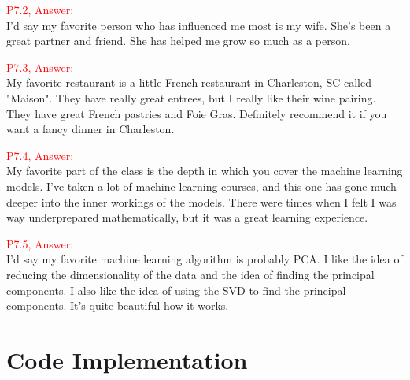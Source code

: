 \documentclass[11pt]{article}
\begin{document}
\textcolor{red}{P7.2, Answer:}\\

I'd say my favorite person who has influenced me most is my wife. She's been a great partner and friend. She has helped me grow so much as a person.

\textcolor{red}{P7.3, Answer:}\\

My favorite restaurant is a little French restaurant in Charleston, SC called "Maison". They have really great entrees, but I really like their
wine pairing. They have great French pastries and Foie Gras. Definitely recommend it if you want a fancy dinner in Charleston.

\textcolor{red}{P7.4, Answer:}\\

My favorite part of the class is the depth in which you cover the machine learning models. I've taken a lot of machine learning courses, and this 
one has gone much deeper into the inner workings of the models. There were times when I felt I was way underprepared mathematically, but it was 
a great learning experience.

\textcolor{red}{P7.5, Answer:}\\

I'd say my favorite machine learning algorithm is probably PCA. I like the idea of reducing the dimensionality of the data and the idea of 
finding the principal components. I also like the idea of using the SVD to find the principal components. It's quite beautiful how it works.

\appendix
\section{Code Implementation}
\end{document}
